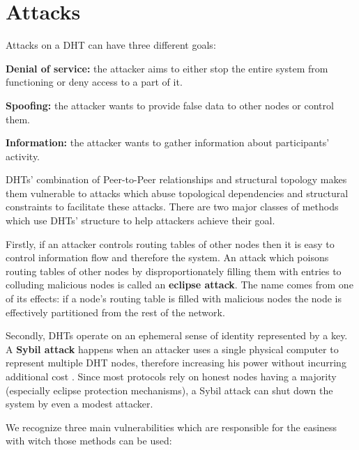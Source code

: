 \section{Attacks}

  Attacks on a DHT can have three different goals:
  \begin{description}
    \item{\textbf{Denial of service:}} the attacker aims to either stop the
      entire system from functioning or deny access to a part of it.
    \item{\textbf{Spoofing:}} the attacker wants to provide false data to other
      nodes or control them.
    \item{\textbf{Information:}} the attacker wants to gather information about
      participants' activity.
  \end{description}

  DHTs' combination of Peer-to-Peer relationships and structural topology makes
  them vulnerable to attacks which abuse topological dependencies and structural
  constraints to facilitate these attacks. There are two major classes of
  methods which use DHTs' structure to help attackers achieve their goal.

  Firstly, if an attacker controls routing tables of other nodes then it is easy
  to control information flow and therefore the system. An attack which poisons
  routing tables of other nodes by disproportionately filling them with entries
  to colluding malicious nodes is called an \textbf{eclipse attack}.
  The name comes from one of its effects: if a node's routing table is filled
  with malicious nodes the node is effectively partitioned from the rest of the
  network.

  Secondly, DHTs operate on an ephemeral sense of identity represented by a key.
  A \textbf{Sybil attack} happens when an attacker uses a single physical
  computer to represent multiple DHT nodes, therefore increasing his power
  without incurring additional cost \cite{dou02}.
  Since most protocols rely on honest nodes having a majority (especially
  eclipse protection mechanisms), a Sybil attack can shut down the system by
  even a modest attacker.

  We recognize three main vulnerabilities which are responsible for the
  easiness with witch those methods can be used:

